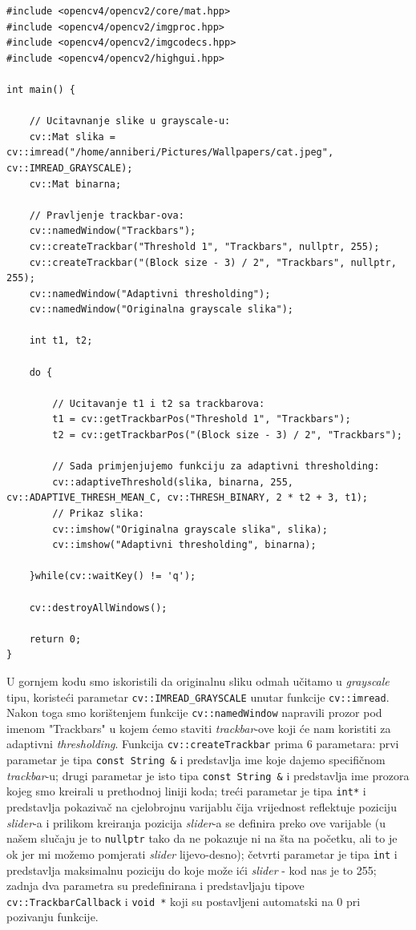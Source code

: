 \documentclass[a4paper, 12pt]{article}
\begin{document}
\begin{lstlisting}
#include <opencv4/opencv2/core/mat.hpp>
#include <opencv4/opencv2/imgproc.hpp>
#include <opencv4/opencv2/imgcodecs.hpp>
#include <opencv4/opencv2/highgui.hpp>

int main() {

    // Ucitavnanje slike u grayscale-u:
    cv::Mat slika = cv::imread("/home/anniberi/Pictures/Wallpapers/cat.jpeg", cv::IMREAD_GRAYSCALE);
    cv::Mat binarna;

    // Pravljenje trackbar-ova:
    cv::namedWindow("Trackbars");
    cv::createTrackbar("Threshold 1", "Trackbars", nullptr, 255);
    cv::createTrackbar("(Block size - 3) / 2", "Trackbars", nullptr, 255);
    cv::namedWindow("Adaptivni thresholding");
    cv::namedWindow("Originalna grayscale slika");

    int t1, t2;

    do {

        // Ucitavanje t1 i t2 sa trackbarova:
        t1 = cv::getTrackbarPos("Threshold 1", "Trackbars");
        t2 = cv::getTrackbarPos("(Block size - 3) / 2", "Trackbars");

        // Sada primjenjujemo funkciju za adaptivni thresholding:
        cv::adaptiveThreshold(slika, binarna, 255, cv::ADAPTIVE_THRESH_MEAN_C, cv::THRESH_BINARY, 2 * t2 + 3, t1);
        // Prikaz slika:
        cv::imshow("Originalna grayscale slika", slika);
        cv::imshow("Adaptivni thresholding", binarna);

    }while(cv::waitKey() != 'q');

    cv::destroyAllWindows();

    return 0;
}
\end{lstlisting}

U gornjem kodu smo iskoristili da originalnu sliku odmah učitamo u \textit{grayscale} tipu, koristeći parametar \lstinline{cv::IMREAD_GRAYSCALE} unutar funkcije \lstinline{cv::imread}. Nakon toga smo korištenjem funkcije \lstinline{cv::namedWindow} napravili prozor pod imenom "Trackbars" u kojem ćemo staviti \textit{trackbar}-ove koji će nam koristiti za adaptivni \textit{thresholding}. Funkcija \lstinline{cv::createTrackbar} prima 6 parametara: prvi parametar je tipa \lstinline{const String &} i predstavlja ime koje dajemo specifičnom \textit{trackbar}-u; drugi parametar je isto tipa \lstinline{const String &} i predstavlja ime prozora kojeg smo kreirali u prethodnoj liniji koda; treći parametar je tipa \lstinline{int*} i predstavlja pokazivač na cjelobrojnu varijablu čija vrijednost reflektuje poziciju \textit{slider}-a i prilikom kreiranja pozicija \textit{slider}-a se definira preko ove varijable (u našem slučaju je to \lstinline{nullptr} tako da ne pokazuje ni na šta na početku, ali to je ok jer mi možemo pomjerati \textit{slider} lijevo-desno); četvrti parametar je tipa \lstinline{int} i predstavlja maksimalnu poziciju do koje može ići \textit{slider} - kod nas je to 255; zadnja dva parametra su predefinirana i predstavljaju tipove \lstinline{cv::TrackbarCallback} i \lstinline{void *} koji su postavljeni automatski na 0 pri pozivanju funkcije.
\end{document}
